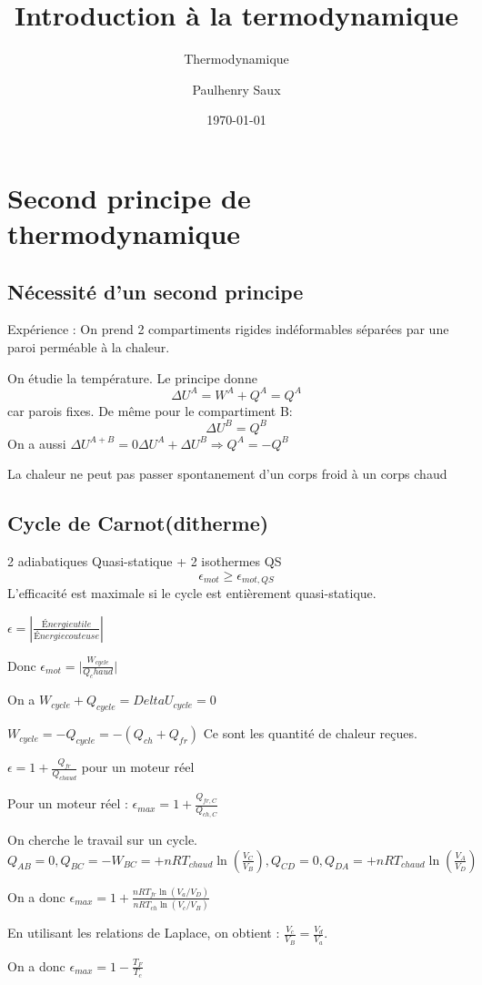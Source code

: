 \documentclass[french]{yLectureNote}
\title{Introduction à la termodynamique}
\subtitle{Thermodynamique}
\author{Paulhenry Saux}
\date{\today}
\begin{document}
\setcounter{chapter}{3}
\chapter{Second principe de thermodynamique}
\section{Nécessité d'un second principe}
Expérience : On prend 2 compartiments rigides indéformables séparées par une paroi perméable à la chaleur.

On étudie la température. Le principe donne 
$$\Delta U^A = W^A+Q^A = Q^A$$ car parois fixes. De même pour le compartiment B:
$$\Delta U^B = Q^B$$
On a aussi $\Delta U^{A+B}=0 \Delta U^A+\Delta U^B \Rightarrow Q^A = -Q^B$
\begin{theorem}
    La chaleur ne peut pas passer spontanement d'un corps froid à un corps chaud
\end{theorem}
\section{Cycle de Carnot(ditherme)}
2 adiabatiques Quasi-statique + 2 isothermes QS
$$\epsilon_{mot} \geq \epsilon_{mot, QS}$$L'efficacité est maximale si le cycle est entièrement quasi-statique.
\begin{definition}[Efficacité]
    $\epsilon = |\frac{Énergie utile}{Énergie couteuse}|$
\end{definition}
Donc $\epsilon_{mot} = \Big|\frac{W_{cycle}}{Q_chaud}\Big|$

On a $W_{cycle} + Q_{cycle} = Delta U_{cycle} = 0$

$W_{cycle} = - Q_{cycle} = -(Q_{ch} + Q_{fr})$ Ce sont les quantité de chaleur reçues.

$\epsilon = 1+ \frac{Q_{fr}}{Q_{chaud}}$ pour un moteur réel

Pour un moteur réel : $\epsilon_{max} = 1+\frac{Q_{fr,C}}{Q_{ch, C}}$

On cherche le travail sur un cycle.
$Q_{AB} = 0, Q_{BC} = -W_{BC} = + nRT_{chaud}\ln(\frac{V_C}{V_B}), Q_{CD} = 0, Q_{DA} = + nRT_{chaud}\ln(\frac{V_A}{V_D})$


On a donc $\epsilon_{max} = 1+ \frac{nR T_{fr}\ln(V_a/V_D)}{nRT_{ch}\ln(V_c/V_B)}$

En utilisant les relations de Laplace, on obtient : $\frac{V_c}{V_B} = \frac{V_d}{V_a}$.

On a donc $\epsilon_{max} = 1-\frac{T_F}{T_c}$
\end{document}
